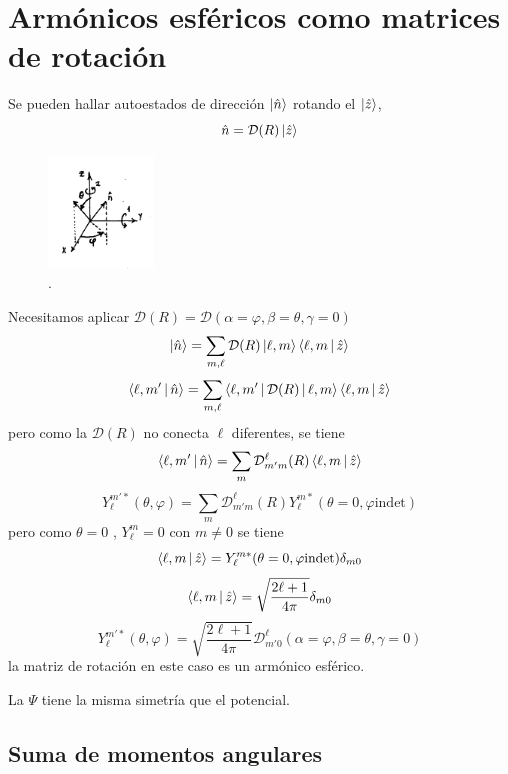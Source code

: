 \documentclass[10pt,oneside]{CBFT_book}
\begin{document}
\chapter{Armónicos esféricos como matrices de rotación}
Se pueden hallar autoestados de dirección $\Ket{\hat{n}}$ rotando el $\Ket{\hat{z}}$,
\[
	\hat{n} = \mathcal{D}(R) \Ket{\hat{z}}
\]

\begin{figure}[!htb]
	\begin{center}
	\includegraphics[width=0.25\textwidth]{images/teo2_12.pdf}
	\end{center}
	\caption{.}
\end{figure} 
Necesitamos aplicar $\mathcal{D}(R)=\mathcal{D}(\alpha=\varphi,\beta=\theta,\gamma=0)$
\[
	\Ket{\hat{n}} = \sum_{m,\ell} \mathcal{D} (R) \Ket{\ell,m}\Braket{\ell,m|\hat{z}}
\]
\[
	\Braket{\ell,m'|\hat{n}} = \sum_{m,\ell} \Braket{\ell,m'|\mathcal{D} (R)| \ell,m}\Braket{\ell,m|\hat{z}}
\]
pero como la $\mathcal{D}(R)$ no conecta $\ell$ diferentes, se tiene 
\[
	\Braket{\ell,m'|\hat{n}} = \sum_{m} \mathcal{D}_{m'm}^\ell(R) \Braket{\ell,m|\hat{z}}	
\]
\[
	Y_\ell^{m'*}(\theta,\varphi) = \sum_m \mathcal{D}_{m'm}^\ell(R) Y_\ell^{m*} (\theta=0,\varphi \text{indet})
\]
pero como $\theta=0$ , $Y_\ell^m = 0$  con $m\neq 0$ se tiene 
\[
	\Braket{\ell,m|\hat{z}} = Y_\ell^{m*} (\theta=0,\varphi \text{indet}) \delta_{m0}
\]
\[
	\Braket{\ell,m|\hat{z}} = \sqrt{ \frac{2\ell +1}{4\pi} } \delta_{m0}
\]
\[
	Y_\ell^{m'*}(\theta,\varphi) = \sqrt{ \frac{2\ell +1}{4\pi} }
	\mathcal{D}_{m'0}^\ell (\alpha=\varphi,\beta=\theta,\gamma=0)
\]
la matriz de rotación en este caso es un armónico esférico.

La $\Psi$ tiene la misma simetría que el potencial.

\section{Suma de momentos angulares}
\end{document}
